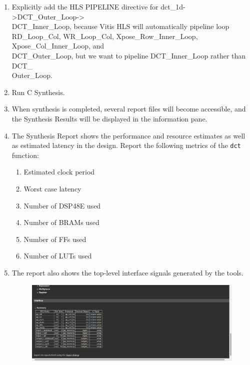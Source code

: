 \documentclass[a4paper,12pt,twoside]{article}
\begin{document}
\begin{enumerate}
    \item Explicitly add the HLS PIPELINE directive for dct\_1d->DCT\_Outer\_Loop->\\
    DCT\_Inner\_Loop, because Vitis HLS will automatically pipeline loop RD\_Loop\_Col, WR\_Loop\_Col, Xpose\_Row\_Inner\_Loop, Xpose\_Col\_Inner\_Loop, and\\
    DCT\_Outer\_Loop, but we want to pipeline DCT\_Inner\_Loop rather than DCT\_\\
    Outer\_Loop.
    \item Run C Synthesis.
    \item When synthesis is completed, several report files will become accessible, and the Synthesis Results will be displayed in the information pane.%
    \item The Synthesis Report shows the performance and resource estimates as well as estimated latency in the design. Report the following metrics of the \texttt{dct} function:
    \begin{enumerate}
        \item Estimated clock period
        \item Worst case latency
        \item Number of DSP48E used
        \item Number of BRAMs used
        \item Number of FFs used
        \item Number of LUTs used
    \end{enumerate}
    \item The report also shows the top-level interface signals generated by the tools.
    \begin{figure}[H]
        \centering
        \includegraphics[width=\textwidth]{images/13.png}

\end{figure}
\end{enumerate}
\end{document}
